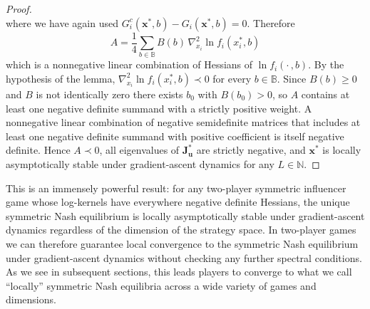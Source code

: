 \documentclass{article}
\begin{document}
\begin{proof}
\begin{equation}
                \end{equation}
                where we have again used $G_i^c(\mathbf{x}^*,b) - G_i(\mathbf{x}^*,b) = 0$. Therefore
                \begin{equation}
                    A = \frac{1}{4}\sum_{b\in\mathbb{B}} B(b)\, 
                    \nabla_{x_i}^2 \ln f_i(x_i^*,b)
                \end{equation}
                which is a nonnegative linear combination of Hessians of $\ln f_i(\cdot\,,b)$. By the hypothesis of the lemma, $\nabla_{x_i}^2\ln f_i(x_i^*,b)\prec 0$ for every $b\in\mathbb{B}$. Since $B(b)\geq 0$ and $B$ is not identically zero there exists $b_0$ with $B(b_0)>0$, so $A$ contains at least one negative definite summand with a strictly positive weight. A nonnegative linear combination of negative semidefinite matrices that includes at least one negative definite summand with positive coefficient is itself negative definite. Hence $A\prec 0$, all eigenvalues of $\mathbf{J}_{\mathbf{u}}^*$ are strictly negative, and $\mathbf{x}^*$ is locally asymptotically stable under gradient-ascent dynamics for any $L\in\mathbb{N}$.
            \end{proof}
            This is an immensely powerful result: for any two-player symmetric influencer game whose log-kernels have everywhere negative definite Hessians, the unique symmetric Nash equilibrium is locally asymptotically stable under gradient-ascent dynamics regardless of the dimension of the strategy space. In two-player games we can therefore guarantee local convergence to the symmetric Nash equilibrium under gradient-ascent dynamics without checking any further spectral conditions. As we see in subsequent sections, this leads players to converge to what we call ``locally'' symmetric Nash equilibria across a wide variety of games and dimensions.
\end{document}

